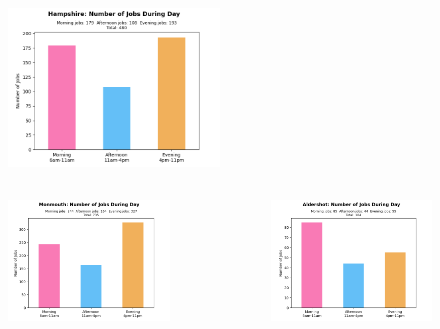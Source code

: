 \documentclass[usenames,dvipsnames]{beamer}
\begin{document}
\begin{frame}
	\begin{figure}
		\includegraphics[width=0.5\textwidth]{figures/Hampshire_timeofday_jobs_abi}
	\end{figure}
	\vspace*{-0.9cm}
	\begin{columns}[T]
		\begin{column}{0.5\textwidth}
			\begin{figure}
				\includegraphics[width=\textwidth]{figures/Monmouth_timeofday_jobs_abi}
			\end{figure}
		\end{column}%
		\begin{column}{0.5\textwidth}
			\begin{figure}
				\includegraphics[width=\textwidth]{figures/Aldershot_timeofday_jobs_abi}

\end{figure}
\end{column}
\end{columns}
\end{frame}
\end{document}
